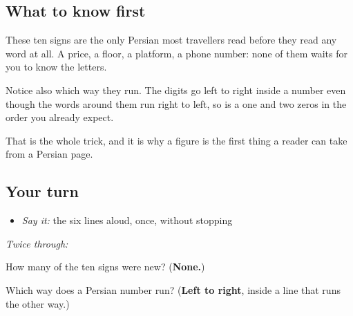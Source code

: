 \subsection*{What to know first}
These ten signs are the only Persian most travellers read before they read any word at all. A price, a floor, a platform, a phone number: none of them waits for you to know the letters.

Notice also which way they run. The digits go left to right inside a number even though the words around them run right to left, so \textbf{} is a one and two zeros in the order you already expect.

That is the whole trick, and it is why a figure is the first thing a reader can take from a Persian page.

\subsection*{Your turn}
\begin{itemize}
\raggedright
  \item \emph{Say it:} the six lines aloud, once, without stopping
\end{itemize}

\emph{Twice through:}

\begin{tcolorbox}[breakable,colback=teal!4,colframe=teal!35!black,title={Before you move on}]
How many of the ten signs were new? (\textbf{None.})

Which way does a Persian number run? (\textbf{Left to right}, inside a line that runs the other way.)
\end{tcolorbox}
